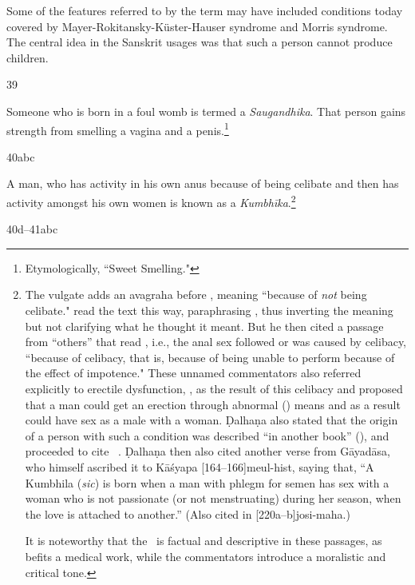 \begin{translation}
{Some of the features referred to by the term  may
have included conditions today covered by
Mayer-Rokitansky-Küster-Hauser syndrome and Morris syndrome.  The
central idea in the Sanskrit usages was that such a person cannot
produce children.}

\item[39]

Someone who is born in a foul womb is termed a \emph{Saugandhika}. 
That person gains strength from smelling a vagina and a
penis.\footnote{Etymologically, “Sweet Smelling."}

\item[40abc]

A man, who has activity in his own anus because of being celibate and
then has activity amongst his own women is known as a
\emph{Kumbhīka}.\footnote{The vulgate adds an avagraha before
    , meaning “because of \emph{not} being celibate."
     read the text this way, paraphrasing
    , thus inverting the meaning but not clarifying
    what he thought it meant.  But he then cited a passage from “others”
    that read , i.e., the anal sex followed or was
    caused by celibacy,  “because of celibacy, that is,
    because of being unable to perform because of the effect of
    impotence."  These unnamed commentators also referred explicitly to
    erectile dysfunction, , as the result of
    this celibacy and proposed that a man could get an erection through
    abnormal () means and as a result could have sex as a
    male with a woman.  Ḍalhaṇa also stated that the origin of a person
    with such a condition was described “in another book”
    (), and proceeded to cite \CS\ .  
    Ḍalhaṇa then also cited another verse from Gāyadāsa, who himself 
    ascribed it to Kāśyapa [164--166]{meul-hist}, saying that, “A 
    Kumbhila (\emph{sic}) is born when a man with phlegm for semen 
    has sex with a woman who is not passionate (or not menstruating) during 
    her season, when the love is attached to another.” (Also cited in 
    [220a--b]{josi-maha}.)
    
    It is noteworthy that the \SS\ is factual and descriptive in
these passages, as befits a medical work, while the commentators
introduce a moralistic and critical tone.}

\item[40d--41abc]


\end{translation}
